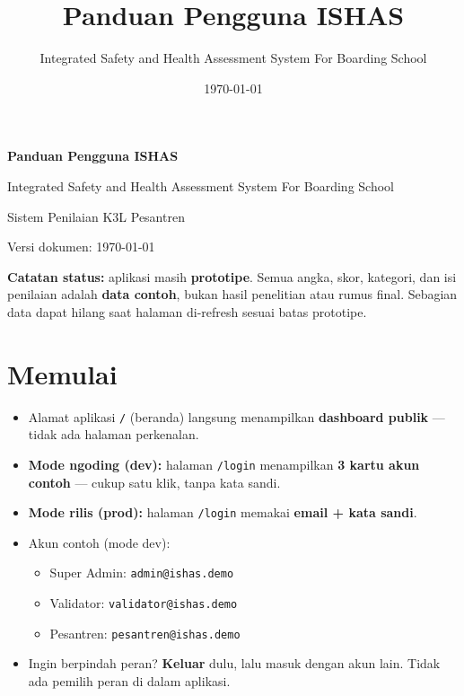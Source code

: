 \documentclass[11pt,a4paper]{article}
\title{\color{ishas}Panduan Pengguna ISHAS}
\author{Integrated Safety and Health Assessment System For Boarding School}
\date{\today}
\newcommand{\code}[1]{\texttt{#1}}
\begin{document}
\begin{titlepage}
  \centering
  \vspace*{3cm}
  {\color{ishas}\Huge\bfseries Panduan Pengguna ISHAS\par}
  \vspace{0.6cm}
  {\large Integrated Safety and Health Assessment System For Boarding School\par}
  \vspace{0.4cm}
  {\large Sistem Penilaian K3L Pesantren\par}
  \vspace{2cm}
  {\large Versi dokumen: \today\par}
  \vfill
  \begin{minipage}{0.86\textwidth}
    \colorbox{ishaslight}{%
      \parbox{\dimexpr\linewidth-2\fboxsep}{%
        \textbf{Catatan status:} aplikasi masih \textbf{prototipe}. Semua angka,
        skor, kategori, dan isi penilaian adalah \textbf{data contoh}, bukan hasil
        penelitian atau rumus final. Sebagian data dapat hilang saat halaman
        di-refresh sesuai batas prototipe.%
      }%
    }
  \end{minipage}
  \vspace{1.2cm}
\end{titlepage}

\tableofcontents
\newpage

\section{Memulai}

\begin{itemize}
  \item Alamat aplikasi \code{/} (beranda) langsung menampilkan \textbf{dashboard publik} ---
        tidak ada halaman perkenalan.
  \item \textbf{Mode ngoding (dev):} halaman \code{/login} menampilkan
        \textbf{3 kartu akun contoh} --- cukup satu klik, tanpa kata sandi.
  \item \textbf{Mode rilis (prod):} halaman \code{/login} memakai
        \textbf{email + kata sandi}.
  \item Akun contoh (mode dev):
        \begin{itemize}
          \item Super Admin: \code{admin@ishas.demo}
          \item Validator: \code{validator@ishas.demo}
          \item Pesantren: \code{pesantren@ishas.demo}
        \end{itemize}
  \item Ingin berpindah peran? \textbf{Keluar} dulu, lalu masuk dengan akun lain.
        Tidak ada pemilih peran di dalam aplikasi.
\end{itemize}
\end{document}
